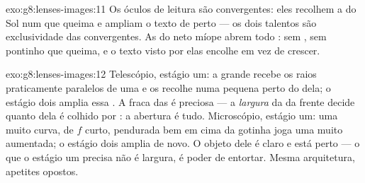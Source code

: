 \begin{solution}{exo:g8:lenses-images:11}
Os óculos de leitura são convergentes: eles recolhem a  do Sol num
 que queima e ampliam o texto de perto --- os dois talentos são
exclusividade das convergentes. As  do neto míope
abrem todo : sem , sem pontinho que queima, e o texto visto
por elas encolhe em vez de crescer.
\end{solution}

\begin{solution}{exo:g8:lenses-images:12}
Telescópio, estágio um: a grande  recebe os raios praticamente
paralelos de uma  e os recolhe numa  pequena perto
do  dela; o estágio dois amplia essa . A  fraca das
 é preciosa --- a \emph{largura} da  da frente decide
quanto dela é colhido por : a abertura é tudo. Microscópio,
estágio um: uma  muito curva, de $f$ curto, pendurada bem em
cima da gotinha joga uma  muito aumentada; o estágio dois
amplia de novo. O objeto dele é claro e está perto --- o que o
estágio um precisa não é largura, é poder de entortar. Mesma
arquitetura, apetites opostos.
\end{solution}

